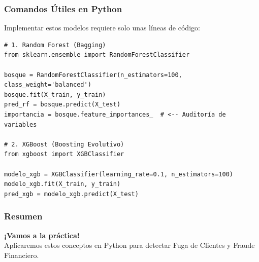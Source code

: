 \documentclass{beamer}
\begin{document}
\begin{frame}[fragile]
\frametitle{Comandos Útiles en Python}
Implementar estos modelos requiere solo unas líneas de código:

\begin{lstlisting}
# 1. Random Forest (Bagging)
from sklearn.ensemble import RandomForestClassifier

bosque = RandomForestClassifier(n_estimators=100, class_weight='balanced')
bosque.fit(X_train, y_train)
pred_rf = bosque.predict(X_test)
importancia = bosque.feature_importances_  # <-- Auditoría de variables

# 2. XGBoost (Boosting Evolutivo)
from xgboost import XGBClassifier

modelo_xgb = XGBClassifier(learning_rate=0.1, n_estimators=100)
modelo_xgb.fit(X_train, y_train)
pred_xgb = modelo_xgb.predict(X_test)
\end{lstlisting}
\end{frame}

\begin{frame}
\frametitle{Resumen}
\begin{center}
\vspace{1cm}
\textbf{\Large ¡Vamos a la práctica!} \\
\vspace{0.5cm}
Aplicaremos estos conceptos en Python para detectar Fuga de Clientes y Fraude Financiero.
\end{center}
\end{frame}
\end{document}
